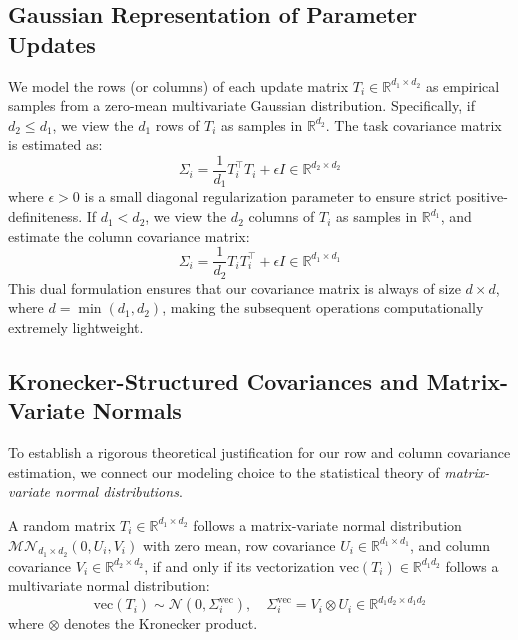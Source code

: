 \documentclass{article}
\theoremstyle{plain}
\theoremstyle{definition}
\theoremstyle{remark}
\begin{document}
\subsection{Gaussian Representation of Parameter Updates}
We model the rows (or columns) of each update matrix $T_i \in \mathbb{R}^{d_1 \times d_2}$ as empirical samples from a zero-mean multivariate Gaussian distribution.
Specifically, if $d_2 \leq d_1$, we view the $d_1$ rows of $T_i$ as samples in $\mathbb{R}^{d_2}$. The task covariance matrix is estimated as:
\begin{equation}
  \Sigma_i = \frac{1}{d_1} T_i^\top T_i + \epsilon I \in \mathbb{R}^{d_2 \times d_2}
\end{equation}
where $\epsilon > 0$ is a small diagonal regularization parameter to ensure strict positive-definiteness.
If $d_1 < d_2$, we view the $d_2$ columns of $T_i$ as samples in $\mathbb{R}^{d_1}$, and estimate the column covariance matrix:
\begin{equation}
  \Sigma_i = \frac{1}{d_2} T_i T_i^\top + \epsilon I \in \mathbb{R}^{d_1 \times d_1}
\end{equation}
This dual formulation ensures that our covariance matrix is always of size $d \times d$, where $d = \min(d_1, d_2)$, making the subsequent operations computationally extremely lightweight.

\subsection{Kronecker-Structured Covariances and Matrix-Variate Normals}
To establish a rigorous theoretical justification for our row and column covariance estimation, we connect our modeling choice to the statistical theory of \emph{matrix-variate normal distributions}. 

A random matrix $T_i \in \mathbb{R}^{d_1 \times d_2}$ follows a matrix-variate normal distribution $\mathcal{MN}_{d_1 \times d_2}(0, U_i, V_i)$ with zero mean, row covariance $U_i \in \mathbb{R}^{d_1 \times d_1}$, and column covariance $V_i \in \mathbb{R}^{d_2 \times d_2}$, if and only if its vectorization $\text{vec}(T_i) \in \mathbb{R}^{d_1 d_2}$ follows a multivariate normal distribution:
\begin{equation}
  \text{vec}(T_i) \sim \mathcal{N}\left(0, \Sigma_i^{\text{vec}}\right), \quad \Sigma_i^{\text{vec}} = V_i \otimes U_i \in \mathbb{R}^{d_1 d_2 \times d_1 d_2}
\end{equation}
where $\otimes$ denotes the Kronecker product. 
\end{document}
